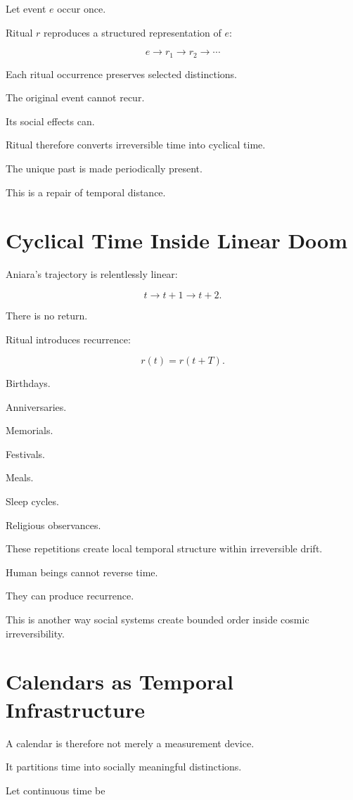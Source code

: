 \documentclass[11pt,oneside]{book}
\theoremstyle{definition}
\theoremstyle{remark}
\begin{document}
Let event \(e\) occur once.

Ritual \(r\) reproduces a structured representation of \(e\):

\[
e
\rightarrow
r_1
\rightarrow
r_2
\rightarrow
\cdots
\]

Each ritual occurrence preserves selected distinctions.

The original event cannot recur.

Its social effects can.

Ritual therefore converts irreversible time into cyclical time.

The unique past is made periodically present.

This is a repair of temporal distance.

\section{Cyclical Time Inside Linear Doom}

Aniara's trajectory is relentlessly linear:

\[
t\rightarrow t+1\rightarrow t+2.
\]

There is no return.

Ritual introduces recurrence:

\[
r(t)
=
r(t+T).
\]

Birthdays.

Anniversaries.

Memorials.

Festivals.

Meals.

Sleep cycles.

Religious observances.

These repetitions create local temporal structure within irreversible drift.

Human beings cannot reverse time.

They can produce recurrence.

This is another way social systems create bounded order inside cosmic irreversibility.

\section{Calendars as Temporal Infrastructure}

A calendar is therefore not merely a measurement device.

It partitions time into socially meaningful distinctions.

Let continuous time be
\end{document}

